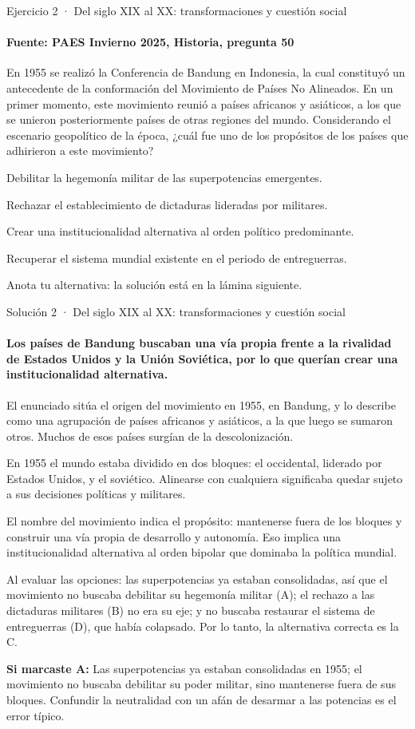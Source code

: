 \documentclass[aspectratio=169,11pt]{beamer}
\newcommand{\alternativa}[2]{\begin{opcion}\tecla{#1}\hspace{0.6em}#2\end{opcion}}
\newcommand{\paso}[2]{\par\noindent\makebox[1.4em][l]{\color{zinc500}\ttfamily\small #1}\parbox[t]{\dimexpr\linewidth-1.4em}{#2}\par\vspace{0.45em}}
\newcommand{\respuesta}[2]{\par\vspace{0.3em}\noindent\teclaok{#1}\hspace{0.5em}{\small\bfseries respuesta oficial}\hspace{0.5em}{\scriptsize\color{zinc500}#2}\par}
\newlength{\ajustealto}
\newenvironment{ajustar}[1][0.74\textheight]
  {\setlength{\ajustealto}{#1}\begin{lrbox}{\ajustecaja}\begin{minipage}{\textwidth}}
  {\end{minipage}\end{lrbox}%
   \ifdim\dimexpr\ht\ajustecaja+\dp\ajustecaja\relax>\ajustealto
     \resizebox*{!}{\ajustealto}{\usebox{\ajustecaja}}\else\usebox{\ajustecaja}\fi}
\begin{document}
\begin{frame}{Ejercicio 2 · Del siglo XIX al XX: transformaciones y cuestión social}
\framesubtitle{Fuente: PAES Invierno 2025, Historia, pregunta 50}
\begin{ajustar}[0.7\textheight]
{\small En 1955 se realizó la Conferencia de Bandung en Indonesia, la cual constituyó un antecedente de la conformación del Movimiento de Países No Alineados. En un primer momento, este movimiento reunió a países africanos y asiáticos, a los que se unieron posteriormente países de otras regiones del mundo. Considerando el escenario geopolítico de la época, ¿cuál fue uno de los propósitos de los países que adhirieron a este movimiento?}
\vspace{0.4em}
\alternativa{A}{Debilitar la hegemonía militar de las superpotencias emergentes.}
\alternativa{B}{Rechazar el establecimiento de dictaduras lideradas por militares.}
\alternativa{C}{Crear una institucionalidad alternativa al orden político predominante.}
\alternativa{D}{Recuperar el sistema mundial existente en el periodo de entreguerras.}
\end{ajustar}
\vfill{\tiny\color{zinc500}\hfill Anota tu alternativa: la solución está en la lámina siguiente.}
\end{frame}

\begin{frame}{Solución 2 · Del siglo XIX al XX: transformaciones y cuestión social}
\framesubtitle{Los países de Bandung buscaban una vía propia frente a la rivalidad de Estados Unidos y la Unión Soviética, por lo que querían crear una institucionalidad alternativa.}
\begin{ajustar}[0.58\textheight]
{\footnotesize
\paso{1}{El enunciado sitúa el origen del movimiento en 1955, en Bandung, y lo describe como una agrupación de países africanos y asiáticos, a la que luego se sumaron otros. Muchos de esos países surgían de la descolonización.}
\paso{2}{En 1955 el mundo estaba dividido en dos bloques: el occidental, liderado por Estados Unidos, y el soviético. Alinearse con cualquiera significaba quedar sujeto a sus decisiones políticas y militares.}
\paso{3}{El nombre del movimiento indica el propósito: mantenerse fuera de los bloques y construir una vía propia de desarrollo y autonomía. Eso implica una institucionalidad alternativa al orden bipolar que dominaba la política mundial.}
\paso{4}{Al evaluar las opciones: las superpotencias ya estaban consolidadas, así que el movimiento no buscaba debilitar su hegemonía militar (A); el rechazo a las dictaduras militares (B) no era su eje; y no buscaba restaurar el sistema de entreguerras (D), que había colapsado. Por lo tanto, la alternativa correcta es la C.}
}
\respuesta{C}{PAES Invierno 2025, Historia, pregunta 50}
\begin{notagris}\scriptsize \textbf{Si marcaste A:} Las superpotencias ya estaban consolidadas en 1955; el movimiento no buscaba debilitar su poder militar, sino mantenerse fuera de sus bloques. Confundir la neutralidad con un afán de desarmar a las potencias es el error típico.\end{notagris}
\end{ajustar}
\end{frame}
\end{document}
